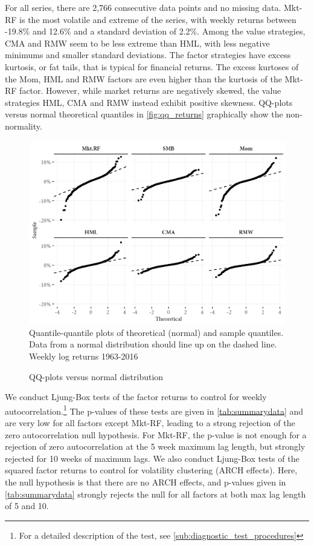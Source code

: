 For all series, there are 2,766 consecutive data points and no missing data. Mkt-RF is the most volatile and extreme of the series, with weekly returns between -19.8\% and 12.6\% and a standard deviation of 2.2\%. Among the value strategies, CMA and RMW seem to be less extreme than HML, with less negative minimums and smaller standard deviations. The factor strategies have excess kurtosis, or fat tails, that is typical for financial returns. The excess kurtoses of the Mom, HML and RMW factors are even higher than the kurtosis of the Mkt-RF factor. However, while market returns are negatively skewed, the value strategies HML, CMA and RMW instead exhibit positive skewness. QQ-plots versus normal theoretical quantiles in \autoref{fig:qq_returns} graphically show the non-normality.
\begin{figure}[htbp]
  \caption{QQ-plots versus normal distribution}
  \label{fig:qq_returns}
  \centering
  \begin{minipage}{\textwidth}
  \includegraphics[scale=1]{graphics/qq_returns.png}  
  \vspace{3mm}
  \footnotesize
  Quantile-quantile plots of theoretical (normal) and sample quantiles. Data from a normal distribution should line up on the dashed line. Weekly log returns 1963-2016
  \end{minipage}
\end{figure}

We conduct Ljung-Box tests of the factor returns to control for weekly autocorrelation.\footnote{For a detailed description of the test, see \autoref{sub:diagnostic_test_procedures}} The p-values of these tests are given in \autoref{tab:summarydata} and are very low for all factors except Mkt-RF, leading to a strong rejection of the zero autocorrelation null hypothesis. For Mkt-RF, the p-value is not enough for a rejection of zero autocorrelation at the 5 week maximum lag length, but strongly rejected for 10 weeks of maximum lags. We also conduct Ljung-Box tests of the squared factor returns to control for volatility clustering (ARCH effects). Here, the null hypothesis is that there are no ARCH effects, and p-values given in \autoref{tab:summarydata} strongly rejects the null for all factors at both max lag length of 5 and 10.

